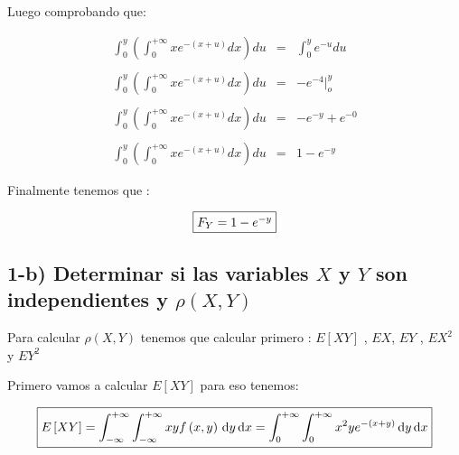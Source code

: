 \documentclass[12pt]{article}
\begin{document}
    Luego comprobando que:

    \begin{equation*}
        \begin{array}{rcl}
            \int_{0}^{y}\left(\int_{0}^{+\infty}xe^{-\left(x+u\right)}dx\right)du & = & \int_{0}^{y} e^{-u }du 
            \\
            \\
            \int_{0}^{y}\left(\int_{0}^{+\infty}xe^{-\left(x+u\right)}dx\right)du & = & -e^{-4}\vert_{o}^{y}
            \\
            \\
            \int_{0}^{y}\left(\int_{0}^{+\infty}xe^{-\left(x+u\right)}dx\right)du & = & -e^{-y}+e^{-0}
            \\
            \\
            \int_{0}^{y}\left(\int_{0}^{+\infty}xe^{-\left(x+u\right)}dx\right)du & = & 1 -e^{-y}
        \end{array}
    \end{equation*}

    Finalmente tenemos que :

    \begin{equation*}
        \fbox{$
        F_{Y}= 1 - e^{-y}
        $}
    \end{equation*}


    \subsection*{1-b) Determinar si las variables $X$ y $Y$ son independientes y $\rho \left(X,Y\right)$}
    
    \begin{flushleft}
        Para calcular $\rho \left(X,Y\right)$  tenemos que calcular primero : $E\left[XY\right]$ , $EX$, $EY$ , $EX^2$ y $EY^2$   
    \end{flushleft}
    

    \begin{flushleft}
        Primero vamos a calcular $E\left[XY\right]$ para eso tenemos: 
    \end{flushleft}
    \begin{equation*}
        \fbox{$
        E\left[XY\right] = \displaystyle \int_{- \infty}^{+ \infty} \int_{-\infty}^{+\infty} xy f\left(x,y\right) \,\mathrm{d}y  \,\mathrm{d}x  = \int_{0}^{+\infty} \int_{0}^{+\infty} x^2ye^{-\left(x+y\right)} \,\mathrm{d}y  \,\mathrm{d}x 
        $}
    \end{equation*}
\end{document}
